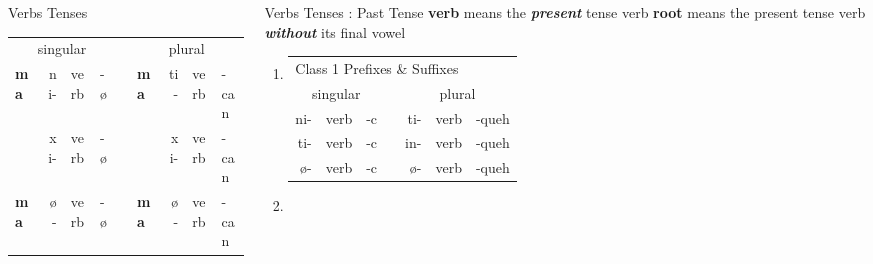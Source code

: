 \documentclass[12pt]{beamer}
\newcommand{\nah}[1]{\textcolor{nahgrn}{#1}}
\newcommand{\trs}[1]{\textcolor{nahblu}{#1}}
\begin{document}
\begin{frame}
\begin{columns}[t]
\begin{column}{.26\linewidth}
\begin{block}{Verbs Tenses}
\begin{enumerate}
					\begin{tabular}[t]{lrllclrll}
						\multicolumn{4}{c}{singular}    & \vline & \multicolumn{4}{c}{plural}        \\
						\cline{1-9}
						\textbf{ma} & \nah{ni-} & verb & \trs{-ø} & \vline & \textbf{ma} & \nah{ti-} & verb & \trs{-can}\\
									& \nah{xi-} & verb & \trs{-ø} & \vline & 			 & \nah{xi-} & verb & \trs{-can}  \\
						\textbf{ma} & \nah{ø-} 	& verb & \trs{-ø} & \vline & \textbf{ma} & \nah{ø-} & verb & \trs{-can}\\
					\end{tabular}%
				\end{enumerate}
			\end{block}
		\end{column}
		\begin{column}{.20\linewidth}
			\begin{block}{Verbs Tenses : Past Tense}
				\textbf{verb} means the \textbf{\textit{present}} tense verb \newline
				\textbf{root} means the present tense verb \textbf{\textit{without}} its final vowel \newline
				\begin{enumerate}
					\item \begin{tabular}[t]{rllcrll}
						\multicolumn{7}{l}{Class 1 \nah{Prefixes} \& \trs{Suffixes}}       	         \\
						\multicolumn{3}{c}{singular}    & \vline & \multicolumn{3}{c}{plural}        \\
						\cline{1-7}
						\nah{ni-}   & verb & \trs{-c}   & \vline & \nah{ti-}   & verb & \trs{-queh}  \\
						\nah{ti-}   & verb & \trs{-c}   & \vline & \nah{in-}   & verb & \trs{-queh}  \\
						\nah{ø-}    & verb & \trs{-c}   & \vline & \nah{ø-}    & verb & \trs{-queh}  \\
					\end{tabular}%
					\item \text{Class 2 \nah{Prefixes} \& \trs{Suffixes}}

\end{enumerate}
\end{block}
\end{column}
\end{columns}
\end{frame}
\end{document}
